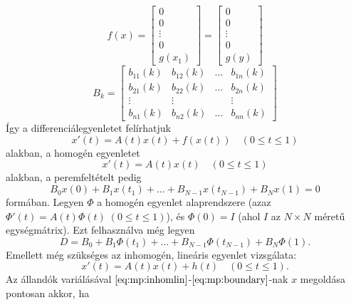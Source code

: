 \documentclass[oneside, titlepage, 12pt, a4paper]{report}
\begin{document}
\begin{equation*}
f(x) =
	\begin{bmatrix}
		0 \\ 0 \\ \vdots \\ 0 \\ g(x_1)
	\end{bmatrix}
=
	\begin{bmatrix}
		0 \\ 0 \\ \vdots \\ 0 \\ g(y)
	\end{bmatrix}
\end{equation*}
\begin{equation*}
B_k =
	\begin{bmatrix}
		b_{11}(k) & b_{12}(k) & \dots & b_{1n}(k) \\
		b_{21}(k) & b_{22}(k) & \dots & b_{2n}(k) \\
		\vdots & \vdots && \vdots \\
		b_{n1}(k) & b_{n2}(k) & \dots & b_{nn}(k)
	\end{bmatrix}
\end{equation*}
Így a differenciálegyenletet felírhatjuk 
\begin{equation}
x'(t) = A(t) x(t) + f(x(t)) \quad (0 \leq t \leq 1) \label{eq:mp:inhom}
\end{equation}
alakban, a homogén egyenletet
\begin{equation}
x'(t) = A(t) x(t) \quad (0 \leq t \leq 1) \label{eq:mp:hom}
\end{equation}
alakban, a peremfeltételt pedig
\begin{equation}
B_0 x(0) + B_1 x(t_1) + \dots + B_{N-1} x(t_{N-1}) + B_N x(1) = 0 \label{eq:mp:boundary}
\end{equation}
formában. Legyen $\Phi$ a homogén egyenlet alaprendszere (azaz $\Phi'(t) = A(t) \Phi(t) \; (0 \leq t \leq 1)$), és $\Phi(0) = I$ (ahol $I$ az $N \times N$ méretű egységmátrix). Ezt felhasználva még legyen
\begin{equation*}
D = B_0 + B_1 \Phi(t_1) + \dots + B_{N-1} \Phi(t_{N-1}) + B_N \Phi(1).
\end{equation*}
Emellett még szükséges az inhomogén, lineáris egyenlet vizsgálata:
\begin{equation}
x'(t) = A(t) x(t) + h(t) \quad (0 \leq t \leq 1). \label{eq:mp:inhomlin}
\end{equation}
Az állandók variálásával $\eqref{eq:mp:inhomlin}$-$\eqref{eq:mp:boundary}$-nak $x$ megoldása pontosan akkor, ha
\end{document}
